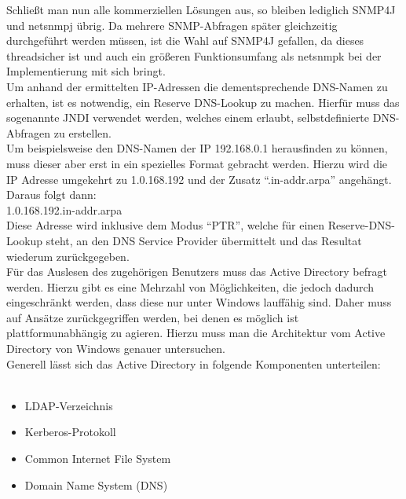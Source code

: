 Schließt man nun alle kommerziellen Lösungen aus, so bleiben lediglich SNMP4J und netsnmpj übrig.
Da mehrere SNMP-Abfragen später gleichzeitig durchgeführt werden müssen, ist die Wahl auf SNMP4J gefallen, da dieses threadsicher ist und auch ein größeren Funktionsumfang als netsnmpk bei der Implementierung mit sich bringt.\\
Um anhand der ermittelten IP-Adressen die dementsprechende DNS-Namen zu erhalten, ist es notwendig, ein Reserve DNS-Lookup zu machen.
Hierfür muss das sogenannte JNDI verwendet werden, welches einem erlaubt, selbstdefinierte DNS-Abfragen zu erstellen.\\
Um beispielsweise den DNS-Namen der IP 192.168.0.1 herausfinden zu können, muss dieser aber erst in ein spezielles Format gebracht werden. Hierzu wird die IP Adresse umgekehrt zu 1.0.168.192 und der Zusatz “.in-addr.arpa” angehängt. Daraus folgt dann:\\

1.0.168.192.in-addr.arpa\\

Diese Adresse wird inklusive dem Modus “PTR”, welche für einen Reserve-DNS-Lookup steht, an den DNS Service Provider übermittelt und das Resultat wiederum zurückgegeben.\\

Für das Auslesen des zugehörigen Benutzers muss das Active Directory befragt werden.
Hierzu gibt es eine Mehrzahl von Möglichkeiten, die jedoch dadurch eingeschränkt werden, dass diese nur unter Windows lauffähig sind. Daher muss auf Ansätze zurückgegriffen werden, bei denen es möglich ist plattformunabhängig zu agieren. Hierzu muss man die Architektur vom Active Directory von Windows genauer untersuchen.\\
Generell lässt sich das Active Directory in folgende Komponenten unterteilen:\\
\\
\begin{itemize}
\item LDAP-Verzeichnis
\item Kerberos-Protokoll
\item Common Internet File System
\item Domain Name System (DNS)
\end{itemize}

